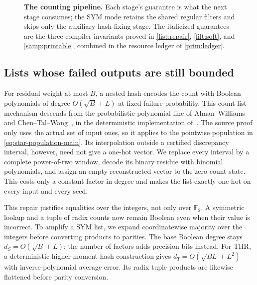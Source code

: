 \documentclass[11pt,letterpaper]{article}
\theoremstyle{definition}
\theoremstyle{remark}
\newcommand{\F}{\mathbb F}
\begin{document}
\begin{figure}[tp]
\caption{\textbf{The counting pipeline.} Each stage's guarantee is what
the next stage consumes; the SYM mode retains the shared regular filters
and skips only the auxiliary hash-fixing stage. The
italicized guarantees are the three compiler invariants proved in
\cref{list:repair}, \cref{filt:soft}, and \cref{samp:printable},
combined in the resource ledger of \cref{prim:ledger}.}
\label{fig:pipeline}
\end{figure}

\subsection{Lists whose failed outputs are still bounded}
For residual weight at most $B$, a nested hash encodes the count with
Boolean polynomials of degree $O(\sqrt B+L)$ at fixed failure
probability. This count-list mechanism descends from the
probabilistic-polynomial line of Alman--Williams and
Chen--Tal--Wang~\cite{AlmanWilliams,CTW}, in the deterministic
implementation of~\cite{NagCubic}.
The source proof only uses the actual set of input ones, so it applies
to the pointwise population in \cref{eq:star-population-main}.
Its interpolation outside a certified discrepancy interval, however,
need not give a one-hot vector. We replace every interval by a complete
power-of-two window, decode its binary residue with binomial
polynomials, and assign an empty reconstructed vector to the zero-count
state. This costs only a constant factor in degree and makes the list
exactly one-hot on every input and every seed.

This repair justifies equalities over the integers, not only over
$\F_2$. A symmetric lookup and a tuple of radix counts now remain
Boolean even when their value is incorrect. To amplify a SYM list, we
expand coordinatewise majority over the integers before converting
products to parities. The base Boolean degree stays
$d_S=O(\sqrt B+L)$; the number of factors adds precision bits instead.
For THR, a deterministic higher-moment hash construction gives
$d_T=O(\sqrt{BL}+L^2)$ with inverse-polynomial average error. Its radix
tuple products are likewise flattened before parity conversion.
\end{document}
